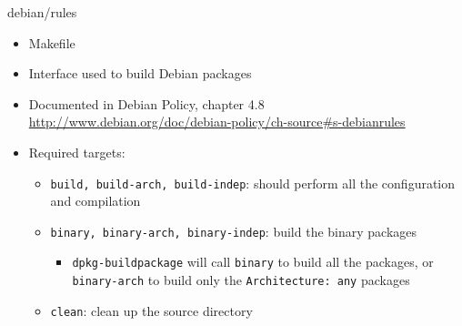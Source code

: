 \documentclass[10pt,final]{beamer}
\begin{document}
\begin{frame}[fragile]{debian/rules}
  \hbr
  \begin{itemize}
  \item Makefile
    \br
  \item Interface used to build Debian packages
    \br
  \item Documented in Debian Policy, chapter 4.8\\
    {\small \url{http://www.debian.org/doc/debian-policy/ch-source\#s-debianrules}}
    \br
  \item Required targets:
    \begin{itemize}
    \item \texttt{build, build-arch, build-indep}: should perform all the configuration and compilation
      \hbr
    \item \texttt{binary, binary-arch, binary-indep}: build the binary packages
      \begin{itemize}
      \item \texttt{dpkg-buildpackage} will call \texttt{binary} to build all
        the packages, or \texttt{binary-arch} to build only the
        \texttt{Architecture:~any} packages
      \end{itemize}
      \hbr
    \item \texttt{clean}: clean up the source directory
    \end{itemize}
  \end{itemize}
\end{frame}
\end{document}
